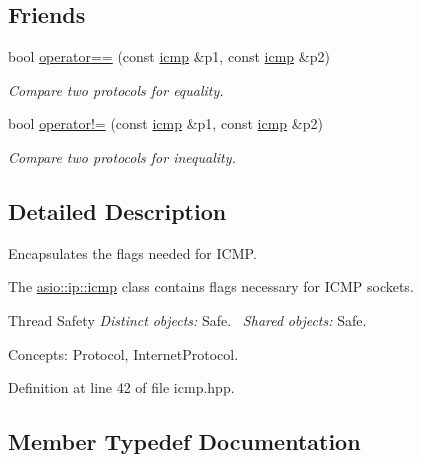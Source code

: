 \subsection*{Friends}
\begin{DoxyCompactItemize}
\item 
bool \hyperlink{classasio_1_1ip_1_1icmp_ab0a2b61230da49b7671f462c4d1c38b5}{operator==} (const \hyperlink{classasio_1_1ip_1_1icmp}{icmp} \&p1, const \hyperlink{classasio_1_1ip_1_1icmp}{icmp} \&p2)
\begin{DoxyCompactList}\small\item\em Compare two protocols for equality. \end{DoxyCompactList}\item 
bool \hyperlink{classasio_1_1ip_1_1icmp_a01f669f18d50a316a1f84c57572063d3}{operator!=} (const \hyperlink{classasio_1_1ip_1_1icmp}{icmp} \&p1, const \hyperlink{classasio_1_1ip_1_1icmp}{icmp} \&p2)
\begin{DoxyCompactList}\small\item\em Compare two protocols for inequality. \end{DoxyCompactList}\end{DoxyCompactItemize}


\subsection{Detailed Description}
Encapsulates the flags needed for I\+C\+M\+P. 

The \hyperlink{classasio_1_1ip_1_1icmp}{asio\+::ip\+::icmp} class contains flags necessary for I\+C\+M\+P sockets.

\begin{DoxyParagraph}{Thread Safety}
{\itshape Distinct} {\itshape objects\+:} Safe.~\newline
{\itshape Shared} {\itshape objects\+:} Safe.
\end{DoxyParagraph}
\begin{DoxyParagraph}{Concepts\+:}
Protocol, Internet\+Protocol. 
\end{DoxyParagraph}


Definition at line 42 of file icmp.\+hpp.



\subsection{Member Typedef Documentation}
\hypertarget{classasio_1_1ip_1_1icmp_a3b92dc29eb90413d1dc80966c2d4b6ae}{}
